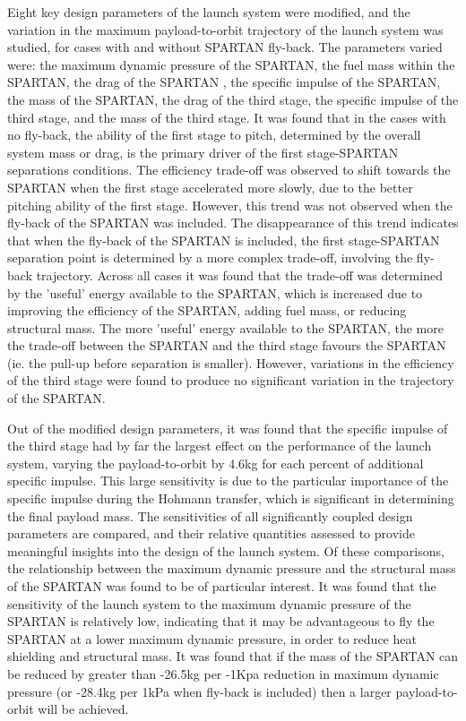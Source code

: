 Eight key design parameters of the launch system were modified, and the variation in the maximum payload-to-orbit trajectory of the launch system was studied, for cases with and without SPARTAN fly-back. 
The parameters varied were: the maximum dynamic pressure of the SPARTAN, the fuel mass within the SPARTAN, the drag of the SPARTAN , the specific impulse of the SPARTAN, the mass of the SPARTAN, the drag of the third stage, the specific impulse of the third stage, and the mass of the third stage. 
It was found that in the cases with no fly-back, the ability of the first stage to pitch, determined by the overall system mass or drag, is the primary driver of the first stage-SPARTAN separations conditions. The efficiency trade-off was observed to shift towards the SPARTAN when the first stage accelerated more slowly, due to the better pitching ability of the first stage. However, this trend was not observed when the fly-back of the SPARTAN was included. The disappearance of this trend indicates that when the fly-back of the SPARTAN is included, the first stage-SPARTAN separation point is determined by a more complex trade-off, involving the fly-back trajectory. 
Across all cases it was found that the trade-off was determined by the 'useful' energy available to the SPARTAN, which is increased due to improving the efficiency of the SPARTAN, adding fuel mass, or reducing structural mass. The more 'useful' energy available to the SPARTAN, the more the trade-off between the SPARTAN and the third stage favours the SPARTAN (ie. the pull-up before separation is smaller).
However, variations in the efficiency of the third stage were found to produce no significant variation in the trajectory of the SPARTAN. 

Out of the modified design parameters, it was found that the specific impulse of the third stage had by far the largest effect on the performance of the launch system, varying the payload-to-orbit by 4.6kg for each percent of additional specific impulse. This large sensitivity is due to the particular importance of the specific impulse during the Hohmann transfer, which is significant in determining the final payload mass. 
The sensitivities of all significantly coupled design parameters are compared, and their relative quantities assessed to provide meaningful insights into the design of the launch system. Of these comparisons, the relationship between the maximum dynamic pressure and the structural mass of the SPARTAN was found to be of particular interest. 
It was found that the sensitivity of the launch system to the maximum dynamic pressure of the SPARTAN is relatively low, indicating that it may be advantageous to fly the SPARTAN at a lower maximum dynamic pressure, in order to reduce heat shielding and structural mass. It was found that if the mass of the SPARTAN can be reduced by greater than -26.5kg per -1Kpa reduction in maximum dynamic pressure (or -28.4kg per 1kPa when fly-back is included) then a larger payload-to-orbit will be achieved.
 

